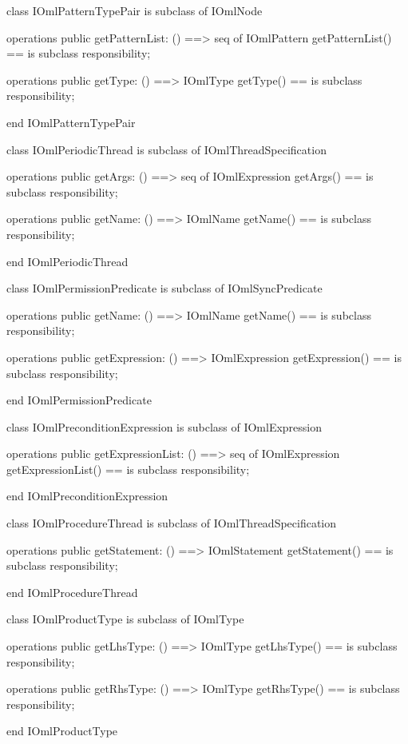 \begin{vdm_al}
class IOmlPatternTypePair
 is subclass of IOmlNode

operations
  public getPatternList: () ==> seq of IOmlPattern
  getPatternList() == is subclass responsibility;

operations
  public getType: () ==> IOmlType
  getType() == is subclass responsibility;

end IOmlPatternTypePair
\end{vdm_al}

\begin{vdm_al}
class IOmlPeriodicThread
 is subclass of IOmlThreadSpecification

operations
  public getArgs: () ==> seq of IOmlExpression
  getArgs() == is subclass responsibility;

operations
  public getName: () ==> IOmlName
  getName() == is subclass responsibility;

end IOmlPeriodicThread
\end{vdm_al}

\begin{vdm_al}
class IOmlPermissionPredicate
 is subclass of IOmlSyncPredicate

operations
  public getName: () ==> IOmlName
  getName() == is subclass responsibility;

operations
  public getExpression: () ==> IOmlExpression
  getExpression() == is subclass responsibility;

end IOmlPermissionPredicate
\end{vdm_al}

\begin{vdm_al}
class IOmlPreconditionExpression
 is subclass of IOmlExpression

operations
  public getExpressionList: () ==> seq of IOmlExpression
  getExpressionList() == is subclass responsibility;

end IOmlPreconditionExpression
\end{vdm_al}

\begin{vdm_al}
class IOmlProcedureThread
 is subclass of IOmlThreadSpecification

operations
  public getStatement: () ==> IOmlStatement
  getStatement() == is subclass responsibility;

end IOmlProcedureThread
\end{vdm_al}

\begin{vdm_al}
class IOmlProductType
 is subclass of IOmlType

operations
  public getLhsType: () ==> IOmlType
  getLhsType() == is subclass responsibility;

operations
  public getRhsType: () ==> IOmlType
  getRhsType() == is subclass responsibility;

end IOmlProductType
\end{vdm_al}

